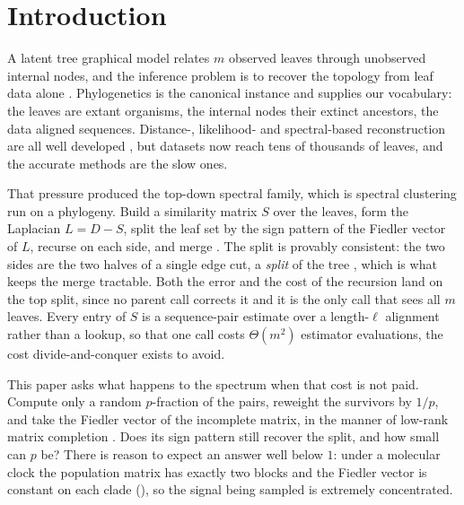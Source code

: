\section{Introduction}\label{sec:intro}

A latent tree graphical model relates $m$ observed leaves through unobserved
internal nodes, and the inference problem is to recover the topology from leaf
data alone \cite{aizenbud2023spectral, semple2003phylogenetics}. Phylogenetics is
the canonical instance and supplies our vocabulary: the leaves are extant
organisms, the internal nodes their extinct ancestors, the data aligned
sequences. Distance-, likelihood- and spectral-based reconstruction are all well
developed \cite{saitou1987neighbor, erdos1999logs, jaffe2021spectral,
mossel2005learning}, but datasets now reach tens of thousands of leaves, and the
accurate methods are the slow ones.

That pressure produced the top-down spectral family, which is spectral clustering
run on a phylogeny. Build a similarity matrix $S$ over the leaves, form the
Laplacian $L=D-S$, split the leaf set by the sign pattern of the Fiedler vector
of $L$, recurse on each side, and merge \cite{aizenbud2023spectral,
vonluxburg2007tutorial, fiedler1975property}. The split is provably consistent:
the two sides are the two halves of a single edge cut, a \emph{split} of the tree
\cite{wilkinson2007clades}, which is what keeps the merge tractable. Both the
error and the cost of the recursion land on the top split, since no parent call
corrects it and it is the only call that sees all $m$ leaves. Every entry of $S$
is a sequence-pair estimate over a length-$\ell$ alignment rather than a lookup,
so that one call costs $\Theta(m^2)$ estimator evaluations, the cost
divide-and-conquer exists to avoid.

This paper asks what happens to the spectrum when that cost is not paid. Compute
only a random $p$-fraction of the pairs, reweight the survivors by $1/p$, and
take the Fiedler vector of the incomplete matrix, in the manner of low-rank
matrix completion \cite{candes2008exact, candes2009power, candes2009matrix,
recht2011simpler, keshavan2010matrix, bhojanapalli2014universal}. Does its sign
pattern still recover the split, and how small can $p$ be? There is reason to
expect an answer well below $1$: under a molecular clock the population matrix
has exactly two blocks and the Fiedler vector is constant on each clade
(), so the signal being sampled is extremely concentrated.

